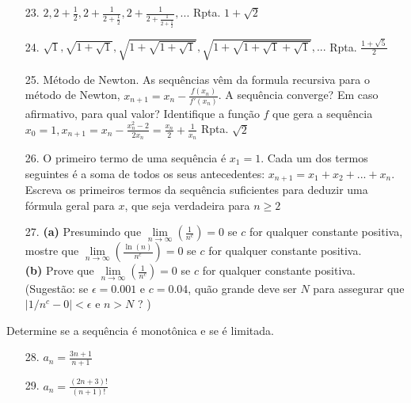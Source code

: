 \begin{itemize}
	\item [23.] $2,2+\frac{1}{2}, 2+\frac{1}{2+\frac{1}{2}}, 2+\frac{1}{2+\frac{1}{2+\frac{1}{2}}},...$ \quad\quad  Rpta. $1+\sqrt{2}$
\end{itemize}
\begin{itemize}
	\item [24.] $\sqrt{1}, \sqrt{1+\sqrt{1}}, \sqrt{1+\sqrt{1+\sqrt{1}}}, \sqrt{1+\sqrt{1+\sqrt{1}+\sqrt{1}}}, ...$ \quad\quad  Rpta. $\frac{1+\sqrt{5}}{2}$
\end{itemize}
\begin{itemize}
	\item [25.] Método de Newton. As sequências vêm da formula recursiva para o método de Newton, $x_{n+1}=x_{n}-\frac{f(x_{n})}{f'(x_{n})}$. A sequência converge? Em caso afirmativo, para qual valor? Identifique a função $f$ que gera a sequência $x_{0}=1, x_{n+1}=x_{n}-\frac{x_{n}^{2}-2}{2x_{n}}=\frac{x_{n}}{2}+\frac{1}{x_{n}}$  \quad\quad  Rpta. $\sqrt{2}$ 
\end{itemize}
\begin{itemize}
	\item [26.] O primeiro termo de uma sequência é $x_{1}=1$. Cada um dos termos seguintes é a soma de todos os seus antecedentes: $x_{n+1}=x_{1}+x_{2}+...+x_{n}$. Escreva os primeiros termos da sequência suficientes para deduzir uma fórmula geral para $x$, que seja verdadeira para $n\geq2$ 
\end{itemize}
\begin{itemize}
	\item [27.]\textbf{(a)} Presumindo que $\lim\limits_{n\rightarrow \infty}(\frac{1}{n^{c}})=0$ se $c$ for qualquer constante
	positiva, mostre que $\lim\limits_{n\rightarrow \infty}(\frac{\ln (n)}{n^{c}})=0$ se $c$ for qualquer constante positiva.\\
	\textbf{ (b)} Prove que $\lim\limits_{n\rightarrow \infty}(\frac{1}{n^{c}})=0$ se $c$ for qualquer constante positiva. (Sugestão: se $\epsilon =0.001$ e $c=0.04$, quão grande deve ser $N$ para assegurar que $\left| 1/n^{c} -0 \right| < \epsilon$ e $n>N$ ? ) 
\end{itemize}
Determine se a sequência é monotônica e
se é limitada.
\begin{itemize}
	\item [28.] $a_{n}=\frac{3n+1}{n+1}$
\end{itemize}
\begin{itemize}
	\item [29.] $a_{n}=\frac{(2n+3)!}{(n+1)!}$
\end{itemize}
